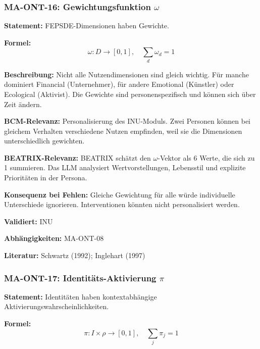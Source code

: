 \subsubsection*{MA-ONT-16: Gewichtungsfunktion $\omega$}

\textbf{Statement:} FEPSDE-Dimensionen haben Gewichte.

\textbf{Formel:}
\begin{equation}
\omega: D \rightarrow [0, 1], \quad \sum_d \omega_d = 1
\end{equation}

\textbf{Beschreibung:}
Nicht alle Nutzendimensionen sind gleich wichtig. Für manche dominiert Financial (Unternehmer), für andere Emotional (Künstler) oder Ecological (Aktivist). Die Gewichte sind personenspezifisch und können sich über Zeit ändern.

\textbf{BCM-Relevanz:}
Personalisierung des INU-Moduls. Zwei Personen können bei gleichem Verhalten verschiedene Nutzen empfinden, weil sie die Dimensionen unterschiedlich gewichten.

\textbf{BEATRIX-Relevanz:}
BEATRIX schätzt den $\omega$-Vektor als 6 Werte, die sich zu 1 summieren. Das LLM analysiert Wertvorstellungen, Lebensstil und explizite Prioritäten in der Persona.

\textbf{Konsequenz bei Fehlen:}
Gleiche Gewichtung für alle würde individuelle Unterschiede ignorieren. Interventionen könnten nicht personalisiert werden.

\textbf{Validiert:} INU

\textbf{Abhängigkeiten:} MA-ONT-08

\textbf{Literatur:} Schwartz (1992); Inglehart (1997)


\subsubsection*{MA-ONT-17: Identitäts-Aktivierung $\pi$}

\textbf{Statement:} Identitäten haben kontextabhängige Aktivierungswahrscheinlichkeiten.

\textbf{Formel:}
\begin{equation}
\pi: I \times \rho \rightarrow [0, 1], \quad \sum_j \pi_j = 1
\end{equation}

